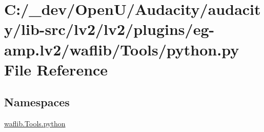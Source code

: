 \hypertarget{lv2_2plugins_2eg-amp_8lv2_2waflib_2_tools_2python_8py}{}\section{C\+:/\+\_\+dev/\+Open\+U/\+Audacity/audacity/lib-\/src/lv2/lv2/plugins/eg-\/amp.lv2/waflib/\+Tools/python.py File Reference}
\label{lv2_2plugins_2eg-amp_8lv2_2waflib_2_tools_2python_8py}
\subsection*{Namespaces}
\begin{DoxyCompactItemize}
\item 
 \hyperlink{namespacewaflib_1_1_tools_1_1python}{waflib.\+Tools.\+python}
\end{DoxyCompactItemize}
